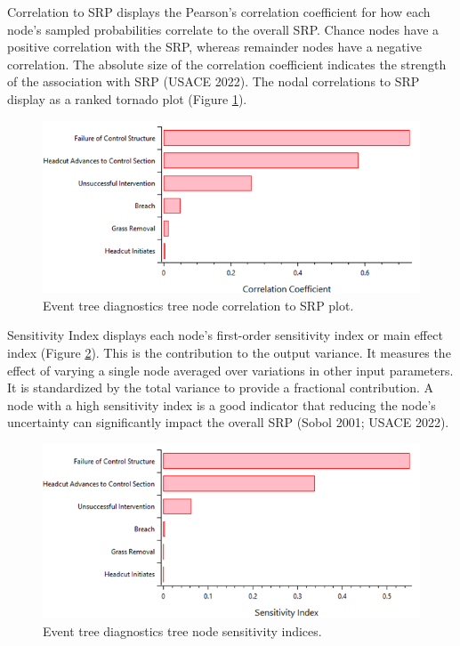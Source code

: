 \documentclass[
]{book}
\begin{document}
Correlation to SRP displays the Pearson's correlation coefficient for how each node's sampled probabilities correlate to the overall SRP. Chance nodes have a positive correlation with the SRP, whereas remainder nodes have a negative correlation. The absolute size of the correlation coefficient indicates the strength of the association with SRP (USACE 2022). The nodal correlations to SRP display as a ranked tornado plot (Figure \ref{fig:figure-95}).

\begin{figure}

{\centering \includegraphics{images/figure95} 

}

\caption{Event tree diagnostics tree node correlation to SRP plot.}\label{fig:figure-95}
\end{figure}

Sensitivity Index displays each node's first-order sensitivity index or main effect index (Figure \ref{fig:figure-96}). This is the contribution to the output variance. It measures the effect of varying a single node averaged over variations in other input parameters. It is standardized by the total variance to provide a fractional contribution. A node with a high sensitivity index is a good indicator that reducing the node's uncertainty can significantly impact the overall SRP (Sobol 2001; USACE 2022).

\begin{figure}

{\centering \includegraphics{images/figure96} 

}

\caption{Event tree diagnostics tree node sensitivity indices.}\label{fig:figure-96}
\end{figure}
\end{document}
